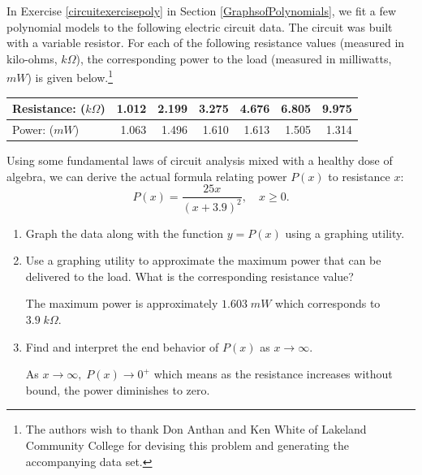 \documentclass{ximera}
\begin{document}
\begin{problem}
In Exercise \ref{circuitexercisepoly} in Section \ref{GraphsofPolynomials}, we fit a few polynomial models to the following electric circuit data. The circuit was built with a variable resistor.  For each of the following resistance values (measured in kilo-ohms, $k \Omega$),  the corresponding power to the load (measured in milliwatts, $mW$) is given below.\footnote{The authors wish to thank Don Anthan and Ken White of Lakeland Community College for devising this problem and generating the accompanying data set.}

\begin{tabular}{|l|r|r|r|r|r|r|} \hline
Resistance: ($k \Omega$) & 1.012 & 2.199 & 3.275 & 4.676 & 6.805 & 9.975 \\ \hline
Power: ($mW$) & 1.063 & 1.496 & 1.610 & 1.613 & 1.505 & 1.314 \\ \hline
\end{tabular}

\noindent Using some fundamental laws of circuit analysis mixed with a healthy dose of algebra, we can derive the actual formula relating power $P(x)$ to resistance $x$:   \[P(x) = \frac{25x}{(x + 3.9)^2}, \quad x \geq 0.\]

\begin{enumerate}

\item Graph the data along with the function $y = P(x)$ using a graphing utility.

\item Use a graphing utility to approximate the maximum power that can be delivered to the load.  What is the corresponding resistance value?

\begin{solution}
    The maximum power is approximately $1.603 \; mW$ which corresponds to $3.9 \; k\Omega$.
\end{solution}

\item Find and interpret the end behavior of $P(x)$ as $x \rightarrow \infty$.

\begin{solution}
    As $x \rightarrow \infty, \; P(x) \rightarrow 0^{+}$ which means as the resistance increases without bound, the power diminishes to zero.
\end{solution}

\end{enumerate}
\end{problem}
\end{document}
